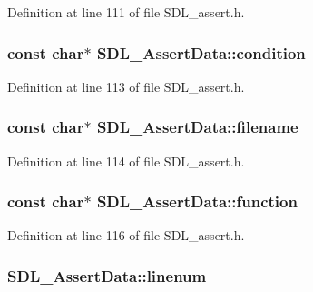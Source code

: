 Definition at line 111 of file S\-D\-L\-\_\-assert.\-h.

\hypertarget{struct_s_d_l___assert_data_aec6d372462fa8c94a9d04c1168cd38c9}{
\subsubsection[{condition}]{\setlength{\rightskip}{0pt plus 5cm}const char$\ast$ S\-D\-L\-\_\-\-Assert\-Data\-::condition}}\label{struct_s_d_l___assert_data_aec6d372462fa8c94a9d04c1168cd38c9}


Definition at line 113 of file S\-D\-L\-\_\-assert.\-h.

\hypertarget{struct_s_d_l___assert_data_acf27f593e6a436386d2cbcf826cf1ef7}{
\subsubsection[{filename}]{\setlength{\rightskip}{0pt plus 5cm}const char$\ast$ S\-D\-L\-\_\-\-Assert\-Data\-::filename}}\label{struct_s_d_l___assert_data_acf27f593e6a436386d2cbcf826cf1ef7}


Definition at line 114 of file S\-D\-L\-\_\-assert.\-h.

\hypertarget{struct_s_d_l___assert_data_a4913c57d4affb813feea82fc5f48a25c}{
\subsubsection[{function}]{\setlength{\rightskip}{0pt plus 5cm}const char$\ast$ S\-D\-L\-\_\-\-Assert\-Data\-::function}}\label{struct_s_d_l___assert_data_a4913c57d4affb813feea82fc5f48a25c}


Definition at line 116 of file S\-D\-L\-\_\-assert.\-h.

\hypertarget{struct_s_d_l___assert_data_ad026d8573970d2402230d5fa3c550b0f}{
\subsubsection[{linenum}]{ S\-D\-L\-\_\-\-Assert\-Data\-::linenum}}\label{struct_s_d_l___assert_data_ad026d8573970d2402230d5fa3c550b0f}


